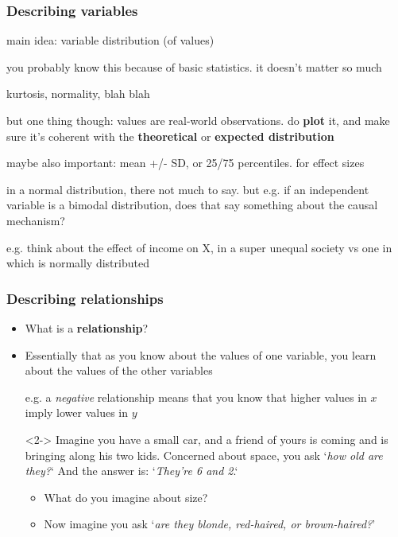 \documentclass[aspectratio=43]{beamer}
\begin{document}
\begin{frame}
\frametitle{Describing variables}
\centering

main idea: variable distribution (of values)

you probably know this because of basic statistics. it doesn't matter so much

kurtosis, normality, blah blah

but one thing though: values are real-world observations. do \textbf{plot} it, and make sure it's coherent with the \textbf{theoretical} or \textbf{expected distribution}

maybe also important: mean +/- SD, or 25/75 percentiles. for effect sizes

in a normal distribution, there not much to say. but e.g. if an independent variable is a bimodal distribution, does that say something about the causal mechanism?

e.g. think about the effect of income on X, in a super unequal society vs one in which is normally distributed

\end{frame}

\begin{frame}
\frametitle{Describing relationships}
\centering

\begin{itemize}
  \item What is a \textbf{relationship}?
  \item Essentially that as you know about the values of one variable, you learn about the values of the other variables
  \item[] e.g. a \textit{negative} relationship means that you know that higher values in $x$ imply lower values in $y$
  \item[]
  \item[]<2-> Imagine you have a small car, and a friend of yours is coming and is bringing along his two kids. Concerned about space, you ask `\textit{how old are they?}` And the answer is: `\textit{They're 6 and 2}.`
  \begin{itemize}
    \item What do you imagine about size?
    \item<3-> Now imagine you ask `\textit{are they blonde, red-haired, or brown-haired?}'
  \end{itemize}
\end{itemize}

\end{frame}
\end{document}
